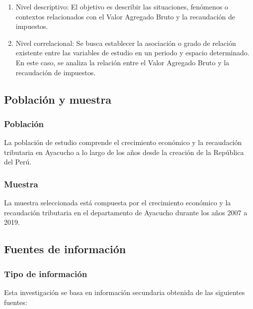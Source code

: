 \documentclass[
  letterpaper,
  DIV=11,
  numbers=noendperiod]{scrartcl}
\begin{document}
\begin{enumerate}
\def\labelenumi{\alph{enumi}.}
\item
  Nivel descriptivo: El objetivo es describir las situaciones, fenómenos
  o contextos relacionados con el Valor Agregado Bruto y la recaudación
  de impuestos.
\item
  Nivel correlacional: Se busca establecer la asociación o grado de
  relación existente entre las variables de estudio en un periodo y
  espacio determinado. En este caso, se analiza la relación entre el
  Valor Agregado Bruto y la recaudación de impuestos.
\end{enumerate}

\hypertarget{sec-poblaciuxf3n-y-muestra}{%
\subsection{Población y muestra}\label{sec-poblaciuxf3n-y-muestra}}

\hypertarget{poblaciuxf3n}{%
\subsubsection{Población}\label{poblaciuxf3n}}

La población de estudio comprende el crecimiento económico y la
recaudación tributaria en Ayacucho a lo largo de los años desde la
creación de la República del Perú.

\hypertarget{muestra}{%
\subsubsection{Muestra}\label{muestra}}

La muestra seleccionada está compuesta por el crecimiento económico y la
recaudación tributaria en el departamento de Ayacucho durante los años
2007 a 2019.

\hypertarget{sec-fuentes-de-informaciuxf3n}{%
\subsection{Fuentes de
información}\label{sec-fuentes-de-informaciuxf3n}}

\hypertarget{tipo-de-informaciuxf3n}{%
\subsubsection{Tipo de información}\label{tipo-de-informaciuxf3n}}

Esta investigación se basa en información secundaria obtenida de las
siguientes fuentes:
\end{document}
